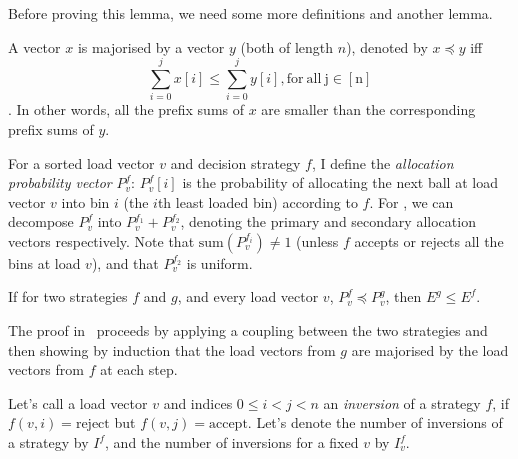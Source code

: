 Before proving this lemma, we need some more definitions and another lemma.


\begin{definition} [majorisation]
A vector $x$ is majorised by a vector $y$ (both of length $n$), denoted by $x \preccurlyeq y$ iff $$\sum_{i=0}^j x[i] \leq \sum_{i=0}^j y[i]\mathrm{, for\ all\ j\in [n]}$$. In other words, all the prefix sums of $x$ are smaller than the corresponding prefix sums of $y$.
\end{definition}


\begin{definition} 
For a sorted load vector $v$ and decision strategy $f$, I define the \textit{allocation probability vector} $P^f_v$: $P^f_v[i]$ is the probability of allocating the next ball at load vector $v$ into bin $i$ (the $i$th least loaded bin) according to $f$. For \TwoThinning, we can decompose $P^f_v$ into $P^{f_1}_{v}+P^{f_2}_{v}$, denoting the primary and secondary allocation vectors respectively. Note that $\mathrm{sum}(P^{f_i}_{v})\neq 1$ (unless $f$ accepts or rejects all the bins at load $v$), and that $P^{f_2}_{v}$ is uniform.
\end{definition}


\begin{lemma}  \label{lemma: majorisation-implies-better}
If for two strategies $f$ and $g$, and every load vector $v$, $P^f_v\preccurlyeq P^g_v$, then $E^g\leq E^f$.
\end{lemma}

\begin{remark}
The proof in~\cite{azar1999twochoice} proceeds by applying a coupling between the two strategies and then showing by induction that the load vectors from $g$ are majorised by the load vectors from $f$ at each step.
\end{remark}


\begin{definition} 
Let's call a load vector $v$ and indices $0\leq i<j<n$ an \textit{inversion} of a strategy $f$, if $f(v,i)=\mathrm{reject}$ but $f(v,j)=\mathrm{accept}$. Let's denote the number of inversions of a strategy by $I^f$, and the number of inversions for a fixed $v$ by $I^f_v$.
\end{definition}


